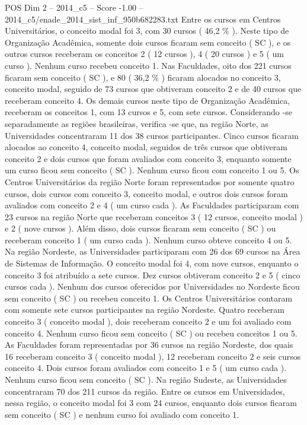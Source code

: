\begin{textsample}{POS Dim 2 – 2014\_c5 – Score -1.00 – 2014\_c5/enade\_2014\_sist\_inf\_950b682283.txt}
Entre os cursos em Centros Universitários, o conceito modal foi 3, com 30 cursos ( 46,2 \% ).
Neste tipo de Organização Acadêmica, somente dois cursos ficaram sem conceito ( SC ), e os outros cursos receberam os conceitos 2 ( 12 cursos ), 4 ( 20 cursos ) e 5 ( um curso ).
Nenhum curso recebeu conceito 1.
Nas Faculdades, oito dos 221 cursos ficaram sem conceito ( SC ), e 80 ( 36,2 \% ) ficaram alocados no conceito 3, conceito modal, seguido de 73 cursos que obtiveram conceito 2 e de 40 cursos que receberam conceito 4.
Os demais cursos neste tipo de Organização Acadêmica, receberam os conceitos 1, com 13 cursos e 5, com sete cursos.
Considerando -se separadamente as regiões brasileiras, verifica -se que, na região Norte, as Universidades concentraram 11 dos 38 cursos participantes.
Cinco cursos ficaram alocados ao conceito 4, conceito modal, seguidos de três cursos que obtiveram conceito 2 e dois cursos que foram avaliados com conceito 3, enquanto somente um curso ficou sem conceito ( SC ).
Nenhum curso ficou com conceito 1 ou 5.
Os Centros Universitários da região Norte foram representados por somente quatro cursos, dois cursos com conceito 3, conceito modal, e outros dois cursos foram avaliados com conceito 2 e 4 ( um curso cada ).
As Faculdades participaram com 23 cursos na região Norte que receberam conceitos 3 ( 12 cursos, conceito modal ) e 2 ( nove cursos ).
Além disso, dois cursos ficaram sem conceito ( SC ) ou receberam conceito 1 ( um curso cada ).
Nenhum curso obteve conceito 4 ou 5.
Na região Nordeste, as Universidades participaram com 26 dos 69 cursos na Área de Sistemas de Informação.
O conceito modal foi 4, com nove cursos, enquanto o conceito 3 foi atribuído a sete cursos.
Dez cursos obtiveram conceito 2 e 5 ( cinco cursos cada ).
Nenhum dos cursos oferecidos por Universidades no Nordeste ficou sem conceito ( SC ) ou recebeu conceito 1.
Os Centros Universitários contaram com somente sete cursos participantes na região Nordeste.
Quatro receberam conceito 3 ( conceito modal ), dois receberam conceito 2 e um foi avaliado com conceito 4.
Nenhum curso ficou sem conceito ( SC ) ou recebeu conceitos 1 ou 5.
As Faculdades foram representadas por 36 cursos na região Nordeste, dos quais 16 receberam conceito 3 ( conceito modal ), 12 receberam conceito 2 e seis cursos conceito 4.
Dois cursos foram avaliados com conceito 1 e 5 ( um curso cada ).
Nenhum curso ficou sem conceito ( SC ).
Na região Sudeste, as Universidades concentraram 70 dos 211 cursos da região.
Entre os cursos em Universidades, nessa região, o conceito modal foi 3 com 24 cursos, enquanto dois cursos ficaram sem conceito ( SC ) e nenhum curso foi avaliado com conceito 1.

\end{textsample}
